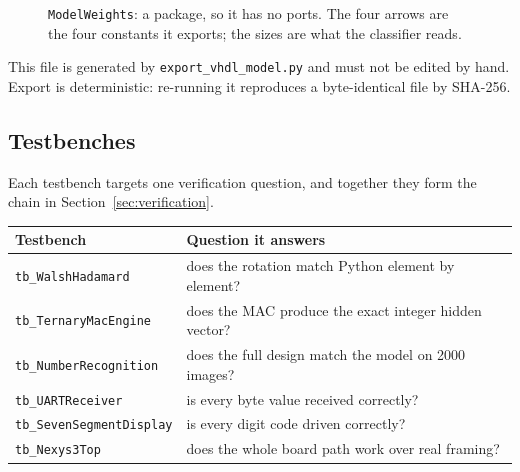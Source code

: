 \documentclass[11pt,a4paper]{article}
\begin{document}
\begin{figure}[H]
\centering
{}
\caption{\texttt{ModelWeights}: a package, so it has no ports. The four arrows
  are the four constants it exports; the sizes are what the classifier reads.}
\label{fig:modelweights}
\end{figure}

This file is generated by \texttt{export\_vhdl\_model.py} and must not be edited
by hand. Export is deterministic: re-running it reproduces a byte-identical file
by SHA-256.

\subsection{Testbenches}
\label{sec:testbenches}

Each testbench targets one verification question, and together they form the
chain in Section~\ref{sec:verification}.

\begin{center}
\small
\begin{tabularx}{\linewidth}{@{}lL@{}}
\toprule
\textbf{Testbench} & \textbf{Question it answers} \\
\midrule
\texttt{tb\_WalshHadamard}      & does the rotation match Python element by element? \\
\texttt{tb\_TernaryMacEngine}   & does the MAC produce the exact integer hidden vector? \\
\texttt{tb\_NumberRecognition}  & does the full design match the model on 2000 images? \\
\texttt{tb\_UARTReceiver}       & is every byte value received correctly? \\
\texttt{tb\_SevenSegmentDisplay}& is every digit code driven correctly? \\
\texttt{tb\_Nexys3Top}          & does the whole board path work over real framing? \\
\bottomrule
\end{tabularx}
\end{center}
\end{document}
